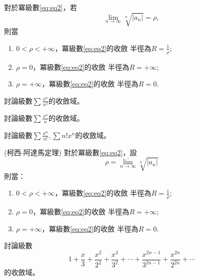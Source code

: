 \documentclass[a4paper,12pt]{article}
\begin{document}
\begin{CJK*}{UTF8}{bsmi}
\begin{theorem}
    對於冪級數\ref{eq:eq2}，若
    \begin{equation}
        \lim_{n \to \infty}\sqrt[n]{\vert a_n \vert} = \rho,
        \label{eq:eq3}
    \end{equation}
    則當
    \begin{enumerate}[label={\rm(\arabic*)}]
        \item $\displaystyle 0 < \rho < +\infty$，冪級數\ref{eq:eq2}的收斂
            半徑為$\displaystyle R = \frac{1}{\rho}$;
        \item $\displaystyle \rho = 0$，冪級數\ref{eq:eq2}的收斂
            半徑為$\displaystyle R = +\infty$;
        \item $\displaystyle \rho = +\infty$，冪級數\ref{eq:eq2}的收斂
            半徑為$\displaystyle R = 0$.
    \end{enumerate}
\end{theorem}

\begin{example}
    討論級數$\displaystyle \sum \frac{x^n}{n^2}$的收斂域。
\end{example}

\begin{example}
    討論級數$\displaystyle \sum \frac{x^n}{n}$的收斂域。
\end{example}

\begin{example}
    討論級數$\displaystyle \sum \frac{x^n}{n!}, \sum n! x^n$的收斂域。
\end{example}

\begin{theorem}{\rm(柯西-阿達馬定理)}
    對於冪級數\ref{eq:eq2}，設
    \[
        \rho = \overline{\lim_{n \to \infty}}\sqrt[n]{\vert a_n \vert}
        \]
    則當：
    \begin{enumerate}[label={\rm(\arabic*)}]
        \item $\displaystyle 0 < \rho < +\infty$，冪級數\ref{eq:eq2}的收斂
            半徑為$\displaystyle R = \frac{1}{\rho}$;
        \item $\displaystyle \rho = 0$，冪級數\ref{eq:eq2}的收斂
            半徑為$\displaystyle R = +\infty$;
        \item $\displaystyle \rho = +\infty$，冪級數\ref{eq:eq2}的收斂
            半徑為$\displaystyle R = 0$.
    \end{enumerate}
\end{theorem}
\begin{example}
    討論級數
    \[
        1 + \frac{x}{3} + \frac{x^2}{2^2} + \frac{x^3}{3^2} + 
        \cdots + \frac{x^{2n-1}}{3^{2n-1}} + \frac{x^{2n}}{2^{2n}} + \cdots
        \]
    的收斂域。
\end{example}


\end{CJK*}
\end{document}
